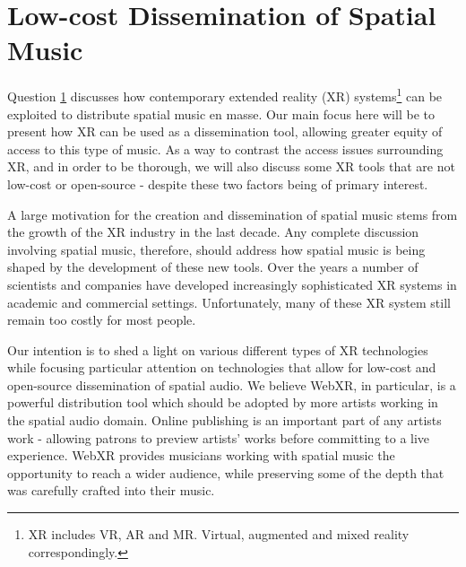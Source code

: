 \chapter{Low-cost Dissemination of Spatial Music}
\label{ch:xr-mus}


Question \ref{ch:xr-mus} discusses how contemporary extended reality (XR) systems\footnote{XR includes VR, AR and MR. Virtual, augmented and mixed reality correspondingly.} can be exploited to distribute spatial music en masse. Our main focus here will be to present how XR can be used as a dissemination tool, allowing greater equity of access to this type of music. As a way to contrast the access issues surrounding XR, and in order to be thorough, we will also discuss some XR tools that are not low-cost or open-source - despite these two factors being of primary interest.


A large motivation for the creation and dissemination of spatial music stems from the growth of the XR industry in the last decade. Any complete discussion involving spatial music, therefore, should address how spatial music is being shaped by the development of these new tools. Over the years a number of scientists and companies have developed increasingly sophisticated XR systems in academic and commercial settings. Unfortunately, many of these XR system still remain too costly for most people. 

Our intention is to shed a light on various different types of XR technologies while focusing particular attention on technologies that allow for low-cost and open-source dissemination of spatial audio. We believe WebXR, in particular, is a powerful distribution tool which should be adopted by more artists working in the spatial audio domain. Online publishing is an important part of any artists work - allowing patrons to preview artists' works before committing to a live experience. WebXR provides musicians working with spatial music the opportunity to reach a wider audience, while preserving some of the depth that was carefully crafted into their music.

